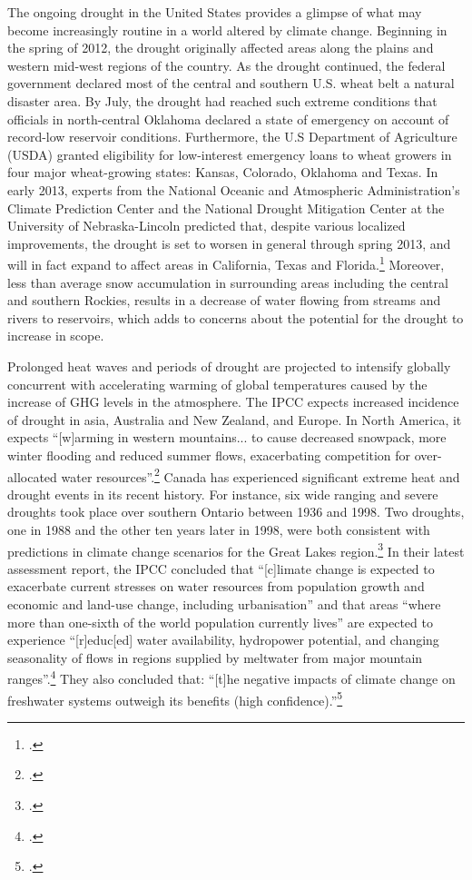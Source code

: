 The ongoing drought in the United States provides a glimpse of what may become increasingly routine in a world altered by climate change.
Beginning in the spring of 2012, the drought originally affected areas along the plains and western mid-west regions of the country. 
As the drought continued, the federal government declared most of the central and southern U.S. wheat belt a natural disaster area. 
By July, the drought had reached such extreme conditions that officials in north-central Oklahoma declared a state of emergency on account of record-low reservoir conditions. 
Furthermore, the U.S Department of Agriculture (USDA) granted eligibility for low-interest emergency loans to wheat growers in four major wheat-growing states: Kansas, Colorado, Oklahoma and Texas. 
In early 2013, experts from the National Oceanic and Atmospheric Administration's Climate Prediction Center and the National Drought Mitigation Center at the University of Nebraska-Lincoln predicted that, despite various localized improvements, the drought is set to worsen in general through spring 2013, and will in fact expand to affect areas in California, Texas and Florida.\footcite[][]{NOAAteleconf2013}
Moreover, less than average snow accumulation in surrounding areas including the central and southern Rockies, results in a decrease of water flowing from streams and rivers to reservoirs, which adds to concerns about the potential for the drought to increase in scope.



Prolonged heat waves and periods of drought are projected to intensify globally concurrent with accelerating warming of global temperatures caused by the increase of GHG levels in the atmosphere.
The IPCC expects increased incidence of drought in asia, Australia and New Zealand, and Europe.
In North America, it expects ``[w]arming in western mountains... to cause decreased snowpack, more winter flooding and reduced summer flows, exacerbating competition for over-allocated water resources''.\footcite[][See: Synthesis report, Table SPM.2. Examples of some projected regional impacts. \url{https://www.ipcc.ch/publications_and_data/ar4/syr/en/spms3.html}]{IPCC2007}
Canada has experienced significant extreme heat and drought events in its recent history. 
For instance, six wide ranging and severe droughts took place over southern Ontario between 1936 and 1998. 
Two droughts, one in 1988 and the other ten years later in 1998, were both consistent with predictions in climate change scenarios for the Great Lakes region.\footcite[][]{Koshida2005}
In their latest assessment report, the IPCC concluded that ``[c]limate change is expected to exacerbate current stresses on water resources from population growth and economic and land-use change, including urbanisation'' and that areas ``where more than one-sixth of the world population currently lives'' are expected to experience ``[r]educ[ed] water availability, hydropower potential, and changing seasonality of flows in regions supplied by meltwater from major mountain ranges''.\footcite[][p. 49]{IPCCar4_syr}
They also concluded that: ``[t]he negative impacts of climate change on freshwater systems outweigh its benefits (high confidence).''\footcite[][p. 49]{IPCCar4_syr}



